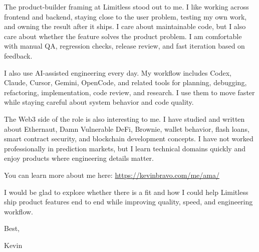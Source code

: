 \documentclass[11pt]{article}
\begin{document}
The product-builder framing at Limitless stood out to me. I like working across frontend and backend, staying close to the user problem, testing my own work, and owning the result after it ships. I care about maintainable code, but I also care about whether the feature solves the product problem. I am comfortable with manual QA, regression checks, release review, and fast iteration based on feedback.

I also use AI-assisted engineering every day. My workflow includes Codex, Claude, Cursor, Gemini, OpenCode, and related tools for planning, debugging, refactoring, implementation, code review, and research. I use them to move faster while staying careful about system behavior and code quality.

The Web3 side of the role is also interesting to me. I have studied and written about Ethernaut, Damn Vulnerable DeFi, Brownie, wallet behavior, flash loans, smart contract security, and blockchain development concepts. I have not worked professionally in prediction markets, but I learn technical domains quickly and enjoy products where engineering details matter.

You can learn more about me here: \href{https://kevinbravo.com/me/ama/}{https://kevinbravo.com/me/ama/}

I would be glad to explore whether there is a fit and how I could help Limitless ship product features end to end while improving quality, speed, and engineering workflow.

Best,

Kevin
\end{document}
